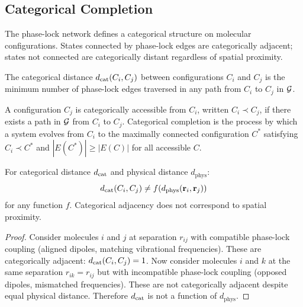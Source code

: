 \subsection{Categorical Completion}

The phase-lock network defines a categorical structure on molecular configurations. States connected by phase-lock edges are categorically adjacent; states not connected are categorically distant regardless of spatial proximity.

\begin{definition}
\label{def:catdist}
The categorical distance $d_{\mathrm{cat}}(C_i, C_j)$ between configurations $C_i$ and $C_j$ is the minimum number of phase-lock edges traversed in any path from $C_i$ to $C_j$ in $\mathcal{G}$.
\end{definition}

\begin{definition}
\label{def:completion}
A configuration $C_j$ is categorically accessible from $C_i$, written $C_i \prec C_j$, if there exists a path in $\mathcal{G}$ from $C_i$ to $C_j$. Categorical completion is the process by which a system evolves from $C_i$ to the maximally connected configuration $C^*$ satisfying $C_i \prec C^*$ and $|E(C^*)| \geq |E(C)|$ for all accessible $C$.
\end{definition}

\begin{theorem}
\label{thm:distance_inequiv}
For categorical distance $d_{\mathrm{cat}}$ and physical distance $d_{\mathrm{phys}}$:
\begin{equation}
d_{\mathrm{cat}}(C_i, C_j) \neq f(d_{\mathrm{phys}}(\mathbf{r}_i, \mathbf{r}_j))
\end{equation}
for any function $f$. Categorical adjacency does not correspond to spatial proximity.
\end{theorem}

\begin{proof}
Consider molecules $i$ and $j$ at separation $r_{ij}$ with compatible phase-lock coupling (aligned dipoles, matching vibrational frequencies). These are categorically adjacent: $d_{\mathrm{cat}}(C_i, C_j) = 1$. Now consider molecules $i$ and $k$ at the same separation $r_{ik} = r_{ij}$ but with incompatible phase-lock coupling (opposed dipoles, mismatched frequencies). These are not categorically adjacent despite equal physical distance. Therefore $d_{\mathrm{cat}}$ is not a function of $d_{\mathrm{phys}}$.
\end{proof}


